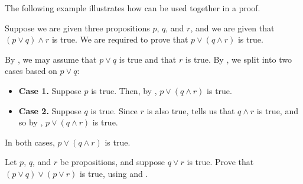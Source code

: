 The following example illustrates how  can be used together in a proof.

\begin{example}
\label{exAssumingDisjunctionsAbstract}
Suppose we are given three propositions $p$, $q$, and $r$, and we are given that $(p \vee q) \wedge r$ is true. We are required to prove that $p \vee (q \wedge r)$ is true.

By , we may assume that $p \vee q$ is true and that $r$ is true. By , we split into two cases based on $p \vee q$:

\begin{itemize}
  \item \textbf{Case 1.} Suppose $p$ is true. Then, by , $p \vee (q \wedge r)$ is true.
  \item \textbf{Case 2.} Suppose $q$ is true. Since $r$ is also true,  tells us that $q \wedge r$ is true, and so by , $p \vee (q \wedge r)$ is true.
\end{itemize}

In both cases, $p \vee (q \wedge r)$ is true.
\end{example}

\begin{exercise}
Let $p$, $q$, and $r$ be propositions, and suppose $q \vee r$ is true. Prove that $(p \vee q) \vee (p \vee r)$ is true, using  and .
\end{exercise}


